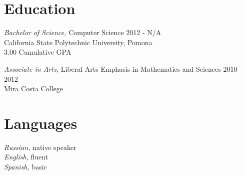 \documentclass[line]{docs/resume/res}
\begin{document}
\address{https://smaslennikov.com}
\address{Email: me@smaslennikov.com}

\begin{resume}

\section{Education}
  {\sl Bachelor of Science,} Computer Science \hfill 2012 - N/A\\
  California State Polytechnic University, Pomona \\
  3.00 Cumulative GPA

  {\sl Associate in Arts,} Liberal Arts Emphasis in Mathematics and Sciences \hfill 2010 - 2012 \\
  Mira Costa College

\section{Languages}
  {\sl Russian,} native speaker \\
  {\sl English,} fluent \\
  {\sl Spanish,} basic


\end{resume}
\end{document}
